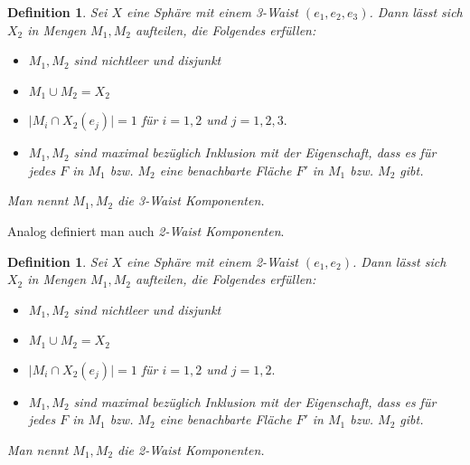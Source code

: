 \documentclass[12pt,titlepage,twoside,cleardoublepage]{article}
\theoremstyle{nummermitklammern}
\newtheorem{definition}[temp]{Definition}
\newtheorem{definition}[zahl]{Definition}
\numberwithin{equation}{section}
\begin{document}
\begin{definition} \label{2waistk}
Sei $X$ eine Sphäre mit einem 3-Waist $(e_1,e_2,e_3)$. Dann lässt sich $X_2$ in  Mengen $M_1,M_2$ aufteilen, die Folgendes erfüllen:
\begin{itemize}
\item $M_1,M_2$ sind nichtleer und disjunkt
\item $M_1\cup M_2=X_2$
\item $\vert M_i \cap X_2(e_j)\vert =1$ für $i=1,2$ und $j=1,2,3.$
\item $M_1,M_2$ sind maximal bezüglich Inklusion mit der Eigenschaft, dass es für jedes $F$ in $M_1$ bzw. $M_2$ eine benachbarte Fläche $F'$ in $M_1$ bzw. $M_2$ gibt.
\end{itemize}  
Man nennt $M_1,M_2$ die \emph{3-Waist Komponenten}. 
\end{definition}
Analog definiert man auch \emph{2-Waist Komponenten}.
\begin{definition}
Sei $X$ eine Sphäre mit einem 2-Waist $(e_1,e_2)$. Dann lässt sich $X_2$ in  Mengen $M_1,M_2$ aufteilen, die Folgendes erfüllen:
\begin{itemize}
\item $M_1,M_2$ sind nichtleer und disjunkt
\item $M_1\cup M_2=X_2$
\item $\vert M_i \cap X_2(e_j)\vert =1$ für $i=1,2$ und $j=1,2.$
\item $M_1,M_2$ sind maximal bezüglich Inklusion mit der Eigenschaft, dass es für jedes $F$ in $M_1$ bzw. $M_2$ eine benachbarte Fläche $F'$ in $M_1$ bzw. $M_2$ gibt.
\end{itemize}  
Man nennt $M_1,M_2$ die \emph{2-Waist Komponenten}. 
\end{definition}
\end{document}
